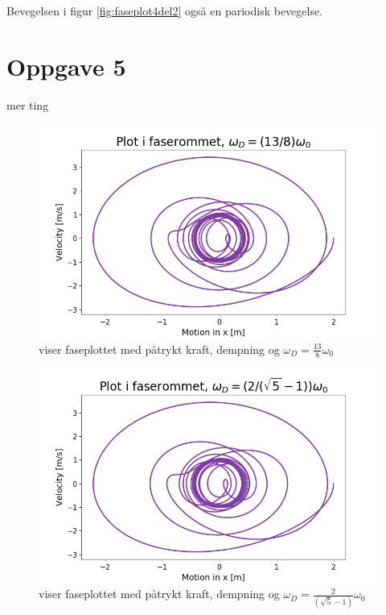 \documentclass[norsk,a4paper,12pt]{article}
\begin{document}
Bevegelsen i figur \ref{fig:faseplot4del2} også en pariodisk bevegelse.



\section*{Oppgave 5}

mer ting
\begin{figure}[H]
\begin{center}
\includegraphics[scale=0.5]{Oppgave5fase1.png}
\caption{viser faseplottet med påtrykt kraft, dempning og $\omega_D = \frac{13}{8}\omega_0$}
\label{fig:faseplot5del1.png}
\end{center}
\end{figure}




\begin{figure}[H]
\begin{center}
\includegraphics[scale=0.5]{Oppgave5fase2.png}
\caption{viser faseplottet med påtrykt kraft, dempning og $\omega_D = \frac{2}{\left(\sqrt{5}-1 \right)}\omega_0$}
\label{fig:faseplot5del2.png}
\end{center}
\end{figure}
\end{document}
